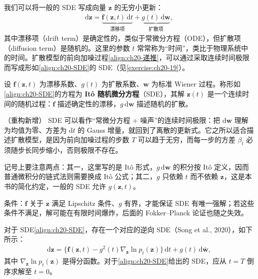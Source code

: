 \documentclass[../../main.tex]{subfiles}
\begin{document}
我们可以将一般的 SDE 写成向量 $\bm{z}$ 的无穷小更新：
\begin{align}
\mathrm{d}\bm{z}=\underbrace{\bm{f}(\bm{z},t)\,\mathrm{d}t}_{\text{漂移项}}+\underbrace{g(t)\,\mathrm{d}\bm{w}}_{\text{扩散项}},
\label{align:ch20-SDE}
\end{align}
其中漂移项（drift term）是确定性的，类似于常微分方程（ODE），但扩散项（diffusion term）是随机的。这里的参数 $t$ 常常称为“时间”，类比于物理系统中的时间。扩散模型的前向加噪过程\eqref{align:ch20-递推}，可以通过采取连续时间极限而写成形如\eqref{align:ch20-SDE}的 SDE（见\cref{exercise:ch20-19}）。

\begin{definition}[随机微分方程]\label{definition:ch20-随机微分方程}
设 $\bm{f}(\bm{z},t)$ 为漂移系数、$g(t)$ 为扩散系数、$\bm{w}$ 为标准 Wiener 过程。称形如\eqref{align:ch20-SDE}的方程为 \textbf{It\^o 随机微分方程}（SDE），其解 $\bm{z}(t)$ 是一个连续时间的随机过程：$\bm{f}$ 描述确定性的漂移，$g\,\mathrm{d}\bm{w}$ 描述随机的扩散。
\end{definition}

\begin{remark}（重构新增）
SDE 可以看作“常微分方程 + 噪声”的连续时间极限：把 $\mathrm{d}\bm{w}$ 理解为均值为零、方差为 $\mathrm{d}t$ 的 Gauss 增量，就回到了离散的更新式。它之所以适合描述扩散模型，是因为前向加噪过程的步数 $T$ 可以趋于无穷，而每一步的方差 $\beta_t$ 必须随步长同步缩小，否则极限不存在。\par
记号上要注意两点：其一，这里写的是 It\^o 形式，$g\,\mathrm{d}\bm{w}$ 的积分按 It\^o 定义，因而普通微积分的链式法则需要换成 It\^o 公式；其二，$g$ 只依赖 $t$ 而不依赖 $\bm{z}$，这是本书的简化约定，一般的 SDE 允许 $g(\bm{z},t)$。\par
条件：$\bm{f}$ 关于 $\bm{z}$ 满足 Lipschitz 条件、$g$ 有界，才能保证 SDE 有唯一强解；若这些条件不满足，解可能在有限时间爆炸，后面的 Fokker--Planck 论证也随之失效。
\end{remark}

对于 SDE\eqref{align:ch20-SDE}，存在一个对应的逆向 SDE（Song et al., 2020），如下所示：
\begin{align}
\mathrm{d}\bm{z}=\big\{\bm{f}(\bm{z},t)-g^2(t)\nabla_{\bm{z}}\ln p_t(\bm{z})\big\}\,\mathrm{d}t+g(t)\,\mathrm{d}\bar{\bm{w}},
\label{align:ch20-逆SDE}
\end{align}
其中 $\nabla_{\bm{z}}\ln p_t(\bm{z})$ 是得分函数。对于\eqref{align:ch20-SDE}给出的 SDE，应从 $t=T$ 倒序求解至 $t=0$。
\end{document}
